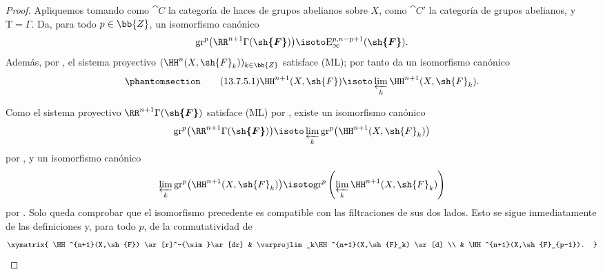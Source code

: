 \documentclass[oneside]{amsart}
\newcommand{\oldpage}[2][]{{\marginnote{\normalfont\textbf{#1}~|~#2}}\ignorespaces}
\let\EGAOriginalLabel\label
\renewcommand{\label}[1]{\phantomsection\EGAOriginalLabel{#1}}
\begin{document}
\begin{proof}
\oldpage[0\textsubscript{III}]{77}
Apliquemos  tomando como $\cat{C}$ la categoría de haces de
grupos abelianos sobre $X$, como $\cat{C}'$ la categoría de grupos abelianos,
y $\mathrm{T}=\Gamma$.
Da, para todo $p\in\bb{Z}$, un isomorfismo canónico
\[
  \mathrm{gr}^p\bigl(\RR^{n+1}\Gamma(\boldsymbol{\sh{F}})\bigr)
  \isoto
  \mathrm{E}_\infty^{p,n-p+1}(\boldsymbol{\sh{F}}).
\]
Además, por , el sistema proyectivo
$(\HH^n(X,\sh{F}_k))_{k\in\bb{Z}}$ satisface {\rm(ML)}; por tanto
 da un isomorfismo canónico
\begin{equation}
\label{0.13.7.5.1b}
\tag{13.7.5.1}
  \HH^{n+1}(X,\sh{F})
  \isoto
  \varprojlim_k\HH^{n+1}(X,\sh{F}_k).
\end{equation}

Como el sistema proyectivo
$\RR^{n+1}\Gamma(\boldsymbol{\sh{F}})$ satisface {\rm(ML)} por
, existe un isomorfismo canónico
\[
  \mathrm{gr}^p\bigl(\RR^{n+1}\Gamma(\boldsymbol{\sh{F}})\bigr)
  \isoto
  \varprojlim_k
  \mathrm{gr}^p\bigl(\HH^{n+1}(X,\sh{F}_k)\bigr)
\]
por , y un isomorfismo canónico
\[
  \varprojlim_k
  \mathrm{gr}^p\bigl(\HH^{n+1}(X,\sh{F}_k)\bigr)
  \isoto
  \mathrm{gr}^p\left(
    \varprojlim_k\HH^{n+1}(X,\sh{F}_k)
  \right)
\]
por .
Solo queda comprobar que el isomorfismo precedente es
compatible con las filtraciones de sus dos lados.
Esto se sigue inmediatamente de las definiciones y, para todo $p$,
de la conmutatividad de
\[
  \xymatrix{
    \HH^{n+1}(X,\sh{F})
      \ar[r]^-{\sim}\ar[dr]
    &
    \varprojlim_k\HH^{n+1}(X,\sh{F}_k)
      \ar[d]
    \\
    &
    \HH^{n+1}(X,\sh{F}_{p-1}).
  }
\]
\end{proof}
\end{document}
